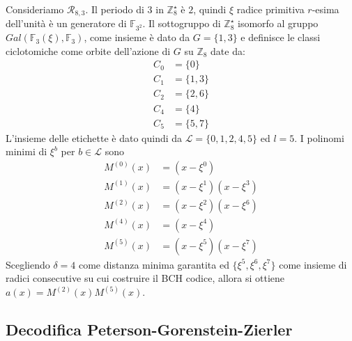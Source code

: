 \begin{esempio}
   Consideriamo $\mathcal{R}_{8,3}$. Il periodo di $3$ in $\mathbb{Z}_{8}^{\star}$ è $2$, quindi $\xi$ radice primitiva $r$-esima dell'unità è un generatore di $\mathbb{F}_{3^2}$. Il sottogruppo di $\mathbb{Z}_{8}^{\star}$ isomorfo al gruppo $Gal(\mathbb{F}_{3}(\xi), \mathbb{F}_{3})$, come insieme è dato da $G = \lbrace 1,3 \rbrace$ e definisce le classi ciclotomiche come orbite dell'azione di $G$ su $\mathbb{Z}_{8}$ date da:
   \begin{align*}
      C_{0} &= \lbrace 0 \rbrace \\
      C_{1} &= \lbrace 1,3 \rbrace \\
      C_{2} &= \lbrace 2,6 \rbrace \\
      C_{4} &= \lbrace 4 \rbrace \\
      C_{5} &= \lbrace 5,7 \rbrace 
   \end{align*}
   L'insieme delle etichette è dato quindi da $\mathscr{L} = \lbrace 0,1,2,4,5 \rbrace $ ed $l = 5$. I polinomi minimi di $\xi^{b}$ per $b\in \mathscr{L}$ sono 
   \begin{align*}
      M^{(0)}(x) &= (x - \xi^{0}) \\
      M^{(1)}(x) &=  (x - \xi^{1})(x - \xi^{3}) \\
      M^{(2)}(x) &=  (x - \xi^{2})(x - \xi^{6})  \\
      M^{(4)}(x) &=  (x - \xi^{4}) \\
      M^{(5)}(x) &=  (x - \xi^{5})(x - \xi^{7})  
   \end{align*}
   Scegliendo $\delta = 4$ come distanza minima garantita ed $\lbrace \xi^{5}, \xi^{6}, \xi^{7} \rbrace$ come insieme di radici consecutive su cui costruire il BCH codice, allora si ottiene $a(x) = M^{(2)}(x)M^{(5)}(x)$.
\end{esempio}


\subsection{Decodifica Peterson-Gorenstein-Zierler}

